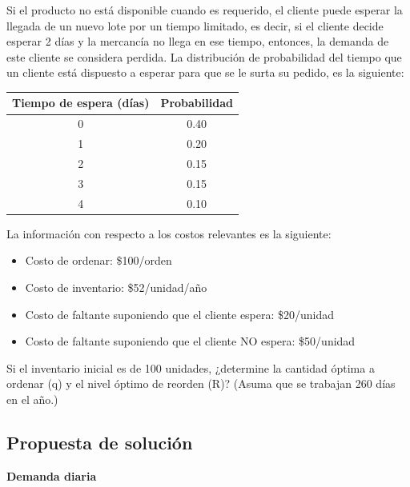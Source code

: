 Si el producto no está disponible cuando es requerido, el cliente puede esperar la llegada de un nuevo lote por un tiempo limitado, es decir, si el cliente decide esperar 2 días y la mercancía no llega en ese tiempo, entonces, la demanda de este cliente se considera perdida. La distribución de probabilidad del tiempo que un cliente está dispuesto a esperar para que se le surta su pedido, es la siguiente:

\begin{center}
\begin{tabular}{cc}
\toprule
Tiempo de espera (días) & Probabilidad \\
\midrule
0 & 0.40 \\
1 & 0.20 \\
2 & 0.15 \\
3 & 0.15 \\
4 & 0.10 \\
\bottomrule
\end{tabular}
\end{center}

La información con respecto a los costos relevantes es la siguiente:

\begin{itemize}
    \item Costo de ordenar: \$100/orden
    \item Costo de inventario: \$52/unidad/año
    \item Costo de faltante suponiendo que el cliente espera: \$20/unidad
    \item Costo de faltante suponiendo que el cliente NO espera: \$50/unidad
\end{itemize}

Si el inventario inicial es de 100 unidades, ¿determine la cantidad óptima a ordenar (q) y el nivel óptimo de reorden (R)? (Asuma que se trabajan 260 días en el año.)

\subsection{Propuesta de solución}

\textbf{Demanda diaria}

